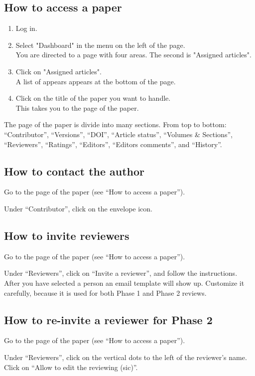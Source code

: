 \documentclass[runningheads]{llncs}
\begin{document}
\subsection*{How to access a paper}

\begin{enumerate}
\item Log in. 
\item Select "Dashboard" in the menu on the left of the page. \\
You are directed to a page with four areas. The second is "Assigned articles". 
\item Click on "Assigned articles". \\
A list of appears appears at the bottom of the page.
\item Click on the title of the paper you want to handle. \\
This takes you to the page of the paper. 
\end{enumerate}

\noindent The page of the paper is divide into many sections. From top to bottom:
``Contributor'', ``Versions'', ``DOI'', ``Article status'', ``Volumes \& Sections'',
``Reviewers'', ``Ratings'',  ``Editors'', ``Editors comments'', and ``History''.

\subsection*{How to contact the author}
Go to the page of the paper (see ``How to access a paper'').

Under ``Contributor'', click on the envelope icon.

\subsection*{How to invite reviewers}
Go to the page of the paper (see ``How to access a paper'').

Under  ``Reviewers'', click on ``Invite a reviewer'', and follow the instructions. 
After you have selected a person an email template will show up. 
Customize it carefully, because it is used for both Phase 1 and Phase 2 reviews.

\subsection*{How to re-invite a reviewer for Phase 2}
Go to the page of the paper (see ``How to access a paper'').

Under ``Reviewers'', click on the vertical dots to the left of the 
reviewer's name.  Click on ``Allow to edit the reviewing (sic)''. 
\end{document}
